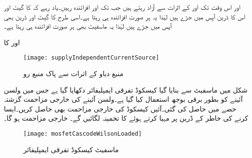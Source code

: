  اور  اس وقت تک  اور  کے اثرات سے آزاد رہتے ہیں جب تک  اور  افزائندہ رہیں۔یاد رہے کہ  کا گیٹ اور اس کا ڈرین آپس میں جڑے ہیں لہٰذا یہ ہر صورت افزائندہ ہی رہتا ہے۔اسی طرح  کا گیٹ اور ڈرین بھی آپس میں جڑے ہیں لہٰذا یہ ماسفیٹ بھی ہر صورت افزائندہ ہی رہتا ہے۔

اور  کا 
\begin{figure}
\centering
\texttt{[image: supplyIndependentCurrentSource]}
\caption{منبع دباو کے اثرات سے پاک منبع رو}
\label{شکل_تفرقی_ماسفیٹ_منبع_سے_آزاد_پیداکار_برقی_رو}
\end{figure}
شکل  میں ماسفیٹ سے بنایا گیا کیسکوڈ تفرقی ایمپلیفائر دکھایا گیا ہے جس میں ولسن آئینے کو بطور برقی بوجھ استعمال کیا گیا ہے۔ولسن آئینے کی خارجی مزاحمت گزشتہ حصے میں حاصل کی گئی۔آئیں کیسکوڈ کی خارجی مزاحمت بھی حاصل کریں۔ایسا کرنے کی خاطر  کے ڈرین پر  مہیا کرتے ہوئے  کا تخمینہ لگائیں گے۔ خارجی مزاحمت ہو گا۔
\begin{figure}
\centering
\texttt{[image: mosfetCascodeWilsonLoaded]}
\caption{ماسفیٹ کیسکوڈ تفرقی ایمپلیفائر}
\label{شکل_تفرقی_ماسفیٹ_کیسکوڈ}
\end{figure}


